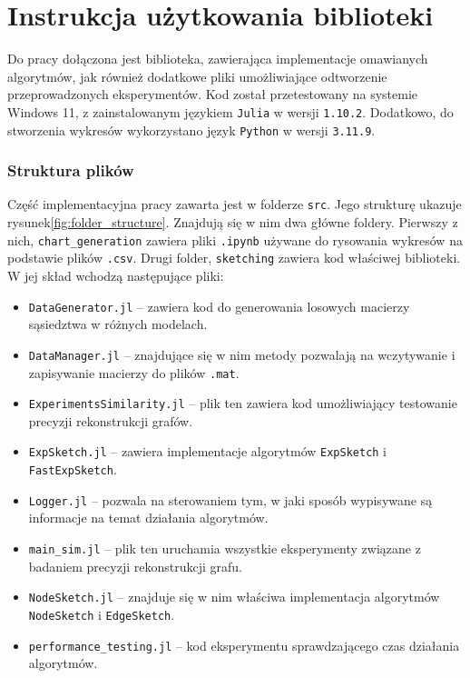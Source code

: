 \chapter{Instrukcja użytkowania biblioteki}

Do pracy dołączona jest biblioteka, zawierająca implementacje omawianych algorytmów, jak również dodatkowe pliki umożliwiające odtworzenie przeprowadzonych eksperymentów. Kod został przetestowany na systemie Windows 11, z zainstalowanym językiem \texttt{Julia}\cite{Julia} w wersji \texttt{1.10.2}. Dodatkowo, do stworzenia wykresów wykorzystano język \texttt{Python}\cite{Python} w wersji \texttt{3.11.9}.  

\subsection*{Struktura plików}

Część implementacyjna pracy zawarta jest w folderze \texttt{src}. Jego strukturę ukazuje rysunek\ref{fig:folder_structure}. Znajdują się w nim dwa główne foldery. Pierwszy z nich, \texttt{chart\_generation} zawiera pliki \texttt{.ipynb} używane do rysowania wykresów na podstawie plików \texttt{.csv}. Drugi folder, \texttt{sketching} zawiera kod właściwej biblioteki. W jej skład wchodzą następujące pliki:
\begin{itemize}
    \item \texttt{DataGenerator.jl} -- zawiera kod do generowania losowych macierzy sąsiedztwa w różnych modelach.
    \item \texttt{DataManager.jl} -- znajdujące się w nim metody pozwalają na wczytywanie i zapisywanie macierzy do plików \texttt{.mat}.
    \item \texttt{ExperimentsSimilarity.jl} -- plik ten zawiera kod umożliwiający testowanie precyzji rekonstrukcji grafów.
    \item \texttt{ExpSketch.jl} -- zawiera implementacje algorytmów \texttt{ExpSketch} i \texttt{FastExpSketch}.
    \item \texttt{Logger.jl} -- pozwala na sterowaniem tym, w jaki sposób wypisywane są informacje na temat działania algorytmów.
    \item \texttt{main\_sim.jl} -- plik ten uruchamia wszystkie eksperymenty związane z badaniem precyzji rekonstrukcji grafu.
    \item \texttt{NodeSketch.jl} -- znajduje się w nim właściwa implementacja algorytmów \texttt{NodeSketch} i \texttt{EdgeSketch}.
    \item \texttt{performance\_testing.jl} -- kod eksperymentu sprawdzającego czas działania algorytmów.
\end{itemize}

